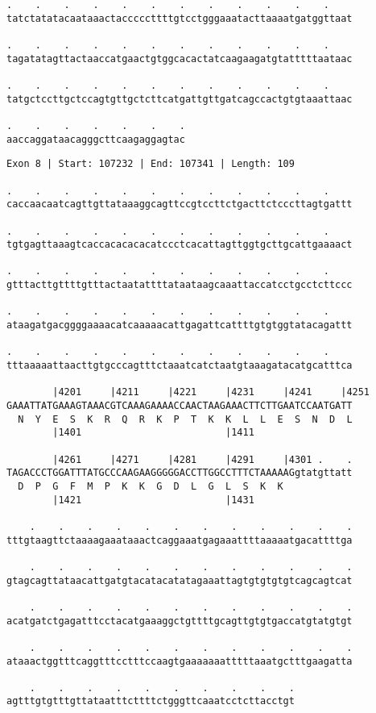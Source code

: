 \documentclass{article}
\begin{document}
\newpage
\begin{Verbatim}[fontfamily=courier]
.    .    .    .    .    .    .    .    .    .    .    .    
tatctatatacaataaactacccccttttgtcctgggaaatacttaaaatgatggttaat

.    .    .    .    .    .    .    .    .    .    .    .    
tagatatagttactaaccatgaactgtggcacactatcaagaagatgtatttttaataac

.    .    .    .    .    .    .    .    .    .    .    .    
tatgctccttgctccagtgttgctcttcatgattgttgatcagccactgtgtaaattaac

.    .    .    .    .    .    .
aaccaggataacagggcttcaagaggagtac
\end{Verbatim}
\newpage
\begin{Verbatim}[fontfamily=courier]
Exon 8 | Start: 107232 | End: 107341 | Length: 109

.    .    .    .    .    .    .    .    .    .    .    .    
caccaacaatcagttgttataaaggcagttccgtccttctgacttctcccttagtgattt

.    .    .    .    .    .    .    .    .    .    .    .    
tgtgagttaaagtcaccacacacacatccctcacattagttggtgcttgcattgaaaact

.    .    .    .    .    .    .    .    .    .    .    .    
gtttacttgttttgtttactaatattttataataagcaaattaccatcctgcctcttccc

.    .    .    .    .    .    .    .    .    .    .    .    
ataagatgacggggaaaacatcaaaaacattgagattcattttgtgtggtatacagattt

.    .    .    .    .    .    .    .    .    .    .    .    
tttaaaaattaacttgtgcccagtttctaaatcatctaatgtaaagatacatgcatttca

        |4201     |4211     |4221     |4231     |4241     |4251
GAAATTATGAAAGTAAACGTCAAAGAAAACCAACTAAGAAACTTCTTGAATCCAATGATT
  N  Y  E  S  K  R  Q  R  K  P  T  K  K  L  L  E  S  N  D  L
        |1401                         |1411                 

        |4261     |4271     |4281     |4291     |4301 .    .
TAGACCCTGGATTTATGCCCAAGAAGGGGGACCTTGGCCTTTCTAAAAAGgtatgttatt
  D  P  G  F  M  P  K  K  G  D  L  G  L  S  K  K            
        |1421                         |1431                 

    .    .    .    .    .    .    .    .    .    .    .    .
tttgtaagttctaaaagaaataaactcaggaaatgagaaattttaaaaatgacattttga

    .    .    .    .    .    .    .    .    .    .    .    .
gtagcagttataacattgatgtacatacatatagaaattagtgtgtgtgtcagcagtcat

    .    .    .    .    .    .    .    .    .    .    .    .
acatgatctgagatttcctacatgaaaggctgttttgcagttgtgtgaccatgtatgtgt

    .    .    .    .    .    .    .    .    .    .    .    .
ataaactggtttcaggtttcctttccaagtgaaaaaaatttttaaatgctttgaagatta

    .    .    .    .    .    .    .    .    .    .
agtttgtgtttgttataatttcttttctgggttcaaatcctcttacctgt
\end{Verbatim}
\end{document}
